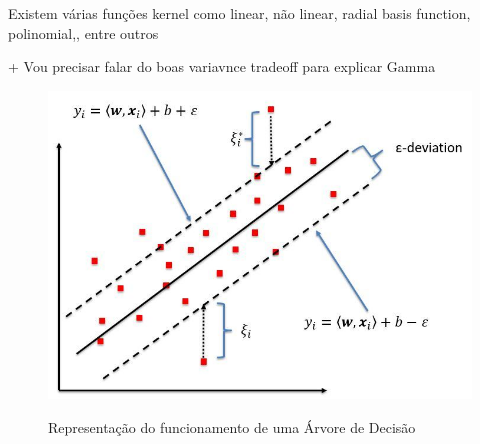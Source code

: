 Existem várias funções kernel como linear, não linear, radial basis function, polinomial,, entre outros

+ Vou precisar falar do boas variavnce tradeoff para explicar Gamma


\begin{figure}[h]
    \centering
    \includegraphics[scale=1.0]{monography/img/svr_example.png}
    \label{figure:rf}
    \caption{Representação do funcionamento de uma Árvore de Decisão\footnotemark}
\end{figure}



